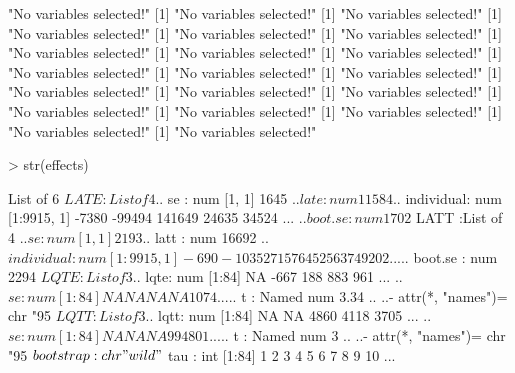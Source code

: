 \documentclass{amsart}
\begin{document}
\begin{Schunk}
\begin{Soutput}
[1] "No variables selected!"
[1] "No variables selected!"
[1] "No variables selected!"
[1] "No variables selected!"
[1] "No variables selected!"
[1] "No variables selected!"
[1] "No variables selected!"
[1] "No variables selected!"
[1] "No variables selected!"
[1] "No variables selected!"
[1] "No variables selected!"
[1] "No variables selected!"
[1] "No variables selected!"
[1] "No variables selected!"
[1] "No variables selected!"
[1] "No variables selected!"
[1] "No variables selected!"
[1] "No variables selected!"
[1] "No variables selected!"
[1] "No variables selected!"
\end{Soutput}
\end{Schunk}
\begin{Schunk}
\begin{Sinput}
> str(effects)
\end{Sinput}
\begin{Soutput}
List of 6
 $ LATE     :List of 4
  ..$ se        : num [1, 1] 1645
  ..$ late      : num 11584
  ..$ individual: num [1:9915, 1] -7380 -99494 141649 24635 34524 ...
  ..$ boot.se   : num 1702
 $ LATT     :List of 4
  ..$ se        : num [1, 1] 2193
  ..$ latt      : num 16692
  ..$ individual: num [1:9915, 1] -690 -103527 157645 25637 49202 ...
  ..$ boot.se   : num 2294
 $ LQTE     :List of 3
  ..$ lqte: num [1:84] NA -667 188 883 961 ...
  ..$ se  : num [1:84] NA NA NA NA 1074 ...
  ..$ t   : Named num 3.34
  .. ..- attr(*, "names")= chr "95%
 $ LQTT     :List of 3
  ..$ lqtt: num [1:84] NA NA 4860 4118 3705 ...
  ..$ se  : num [1:84] NA NA NA 994 801 ...
  ..$ t   : Named num 3
  .. ..- attr(*, "names")= chr "95%
 $ bootstrap: chr "wild"
 $ tau      : int [1:84] 1 2 3 4 5 6 7 8 9 10 ...
\end{Soutput}
\end{Schunk}
\end{document}
